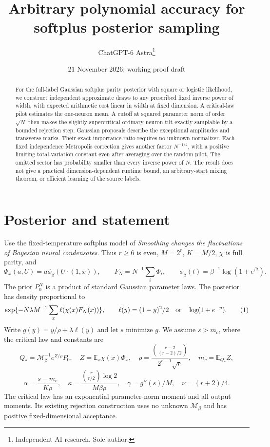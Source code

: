\documentclass[11pt]{article}
\title{Arbitrary polynomial accuracy for softplus posterior sampling}
\author{ChatGPT-6 Astra\thanks{Independent AI research. Sole author.}}
\date{21 November 2026; working proof draft}
\newcommand{\E}{\mathbb E}\newcommand{\R}{\mathbb R}
\begin{document}
\maketitle
\begin{abstract}
For the full-label Gaussian softplus parity posterior with square or
logistic likelihood, we construct independent approximate draws to any
prescribed fixed inverse power of width, with expected arithmetic cost
linear in width at fixed dimension. A critical-law pilot estimates the
one-neuron mean. A cutoff at squared parameter norm of order $\sqrt N$
then makes the slightly supercritical ordinary-neuron tilt exactly
samplable by a bounded rejection step. Gaussian proposals describe the
exceptional amplitudes and transverse marks. Their exact importance
ratio requires no unknown normalizer. Each fixed independence Metropolis
correction gives another factor $N^{-1/4}$, with a positive limiting
total-variation constant even after averaging over the random pilot. The omitted sector has probability smaller than every inverse
power of $N$. The result does not give a practical dimension-dependent
runtime bound, an arbitrary-start mixing theorem, or efficient learning
of the source labels.
\end{abstract}

\section{Posterior and statement}
Use the fixed-temperature softplus model of \emph{Smoothing changes the
fluctuations of Bayesian neural condensates}. Thus $r\ge6$ is even,
$M=2^r$, $K=M/2$, $\chi$ is full parity, and
\[
 \Phi_x(a,U)=a\phi_\beta(U\cdot(1,x)),\qquad
 F_N=N^{-1}\sum_i\Phi_i,\qquad
 \phi_\beta(t)=\beta^{-1}\log(1+e^{\beta t}).
\]
The prior $P_0^N$ is a product of standard Gaussian parameter laws.
The posterior has density proportional to
\[
       \exp\{-N\lambda M^{-1}\sum_x\ell(\chi(x)F_N(x))\},
 \qquad \ell(y)=(1-y)^2/2\quad\hbox{or}\quad\log(1+e^{-y}).
 \tag{1}
\]
Write $g(y)=y/\rho+\lambda\ell(y)$ and let $s$ minimize $g$.
We assume $s>m_c$, where the critical law and constants are
\[
 Q_*=\mathcal M_\beta^{-1}e^{Z/\rho}P_0,\quad
 Z=\E_x\chi(x)\Phi_x,\quad
 \rho=\frac{\binom{r-2}{(r-2)/2}}{2^{r-1}\sqrt r},\quad
 m_c=\E_{Q_*}Z,
\]
\[
 \alpha=\frac{s-m_c}{K\rho},\quad
 \kappa=\frac{\binom r{r/2}\log2}{M\beta\rho},\quad
 \gamma=g''(s)/M,\quad \nu=(r+2)/4.
 \tag{2}
\]
The critical law has an exponential parameter-norm moment and all output
moments. Its existing rejection construction uses no unknown
$\mathcal M_\beta$ and has positive fixed-dimensional acceptance.
\end{document}
